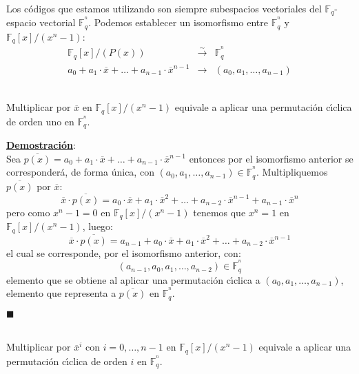 Los c\'odigos que estamos utilizando son siempre subespacios vectoriales del
$\mathbb{F}_q$-espacio vectorial $\mathbb{F}^{^n}_q$. Podemos establecer un
isomorfismo entre $\mathbb{F}^{^n}_q$ y $\mathbb{F}_q[x]/(x^n-1)$:
\begin{displaymath}
\begin{array}{rcl}
\mathbb{F}_q[x]/(P(x))&\stackrel{\sim }\longrightarrow&\mathbb{F}^{^n}_q\\
a_0+a_1\cdot \overline{x}+\dots+a_{n-1}\cdot\overline{x}^{n-1}&\longrightarrow&
(a_0,a_1,\dots,a_{n-1})
\end{array}
\end{displaymath}
\begin{proposicion}\label{pro:EquivPCicl}
\ \\
Multiplicar por $\overline{x}$ en $\mathbb{F}_q[x]/(x^n-1)$ equivale a aplicar
una permutaci\'on c\'{\i}clica de orden uno en $\mathbb{F}^{^n}_q$.
\end{proposicion}
\underline{\textbf{Demostraci\'on}}:\\
Sea $\overline{p(x)}=a_0+a_1\cdot \overline{x}+\dots+a_{n-1}\cdot
\overline{x}^{n-1}$ entonces por el isomorfismo anterior se corresponder\'a, de
forma \'unica, con $(a_0,a_1,\dots,a_{n-1})\in \mathbb{F}^{^n}_q$.
Multipliquemos $\overline{p(x)}$ por $\overline{x}$:
\begin{displaymath}
\overline{x}\cdot \overline{p(x)} = a_0\cdot \overline{x}+a_1\cdot
\overline{x}^2+\dots+a_{n-2}\cdot \overline{x}^{n-1}+a_{n-1}\cdot
\overline{x}^n
\end{displaymath}
pero como $x^n-1=0$ en $\mathbb{F}_q[x]/(x^n-1)$ tenemos que $x^n=1$ en
$\mathbb{F}_q[x]/(x^n-1)$, luego:
\begin{displaymath}
\overline{x}\cdot \overline{p(x)} = a_{n-1}+a_0\cdot \overline{x}+a_1\cdot
\overline{x}^2+\dots+a_{n-2}\cdot\overline{x}^{n-1}
\end{displaymath}
el cual se corresponde, por el isomorfismo anterior, con:
\begin{displaymath}
(a_{n-1},a_0,a_1,\dots,a_{n-2})\in\mathbb{F}^{^n}_q
\end{displaymath}
elemento que se obtiene al aplicar una permutaci\'on c\'{\i}clica a
$(a_0,a_1,\dots,a_{n-1})$, elemento que representa a
$\overline{p(x)}$ en $\mathbb{F}^{^n}_q$.
\begin{flushright}
$\blacksquare$
\end{flushright}
%
\begin{corolario}
\ \\
Multiplicar por $\overline{x}^i$ con $i=0,\dots,n-1$ en
$\mathbb{F}_q[x]/(x^n-1)$ equivale a aplicar una permutaci\'on c\'{\i}clica de
orden $i$ en $\mathbb{F}^{^n}_q$.
\end{corolario}
